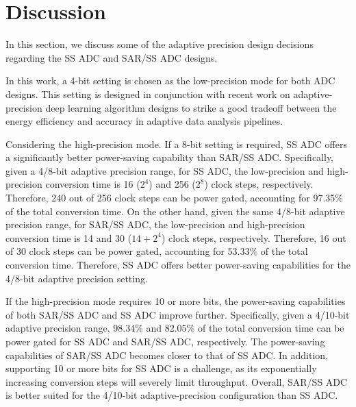 \section{Discussion}\label{discussion}

In this section, we discuss some of the adaptive precision design decisions regarding the SS ADC and SAR/SS ADC designs. 


In this work, a 4-bit setting is chosen as the low-precision mode for both ADC designs. This 
setting is designed in conjunction with recent work on adaptive-precision deep learning algorithm 
designs to strike a good tradeoff between the energy efficiency and accuracy in adaptive data analysis 
pipelines. 


Considering the high-precision mode. If a 8-bit setting is required, SS ADC offers a significantly better power-saving
capability than SAR/SS ADC. Specifically, given a 4/8-bit adaptive precision range, for SS ADC, the 
low-precision and high-precision conversion time is 16 ($2^4$) and 256 ($2^8$) clock steps, respectively. Therefore, 
240 out of 256 clock steps can be power gated, accounting for 97.35\% of the total conversion time.  
On the other hand, given the same 4/8-bit adaptive precision range, for SAR/SS ADC, the low-precision and 
high-precision conversion time is 14 and 30 ($14+2^4$) clock steps, respectively. Therefore, 16 out of 30 clock steps 
can be power gated, accounting for 53.33\% of the total conversion time. Therefore, SS ADC offers better power-saving
capabilities for the 4/8-bit adaptive precision setting. 

If the high-precision mode requires 10 or more bits, the power-saving capabilities of both SAR/SS 
ADC and SS ADC improve further. Specifically, given a 4/10-bit adaptive precision range, 98.34\% and 82.05\% of the 
total conversion time can be power gated for SS ADC and SAR/SS ADC, respectively. The power-saving capabilities of 
SAR/SS ADC becomes closer to that of SS ADC. In addition, supporting 10 or more bits for SS ADC is a challenge, as 
its exponentially increasing conversion steps will severely limit throughput. 
Overall, SAR/SS ADC is better suited for the 4/10-bit adaptive-precision configuration than SS ADC.

